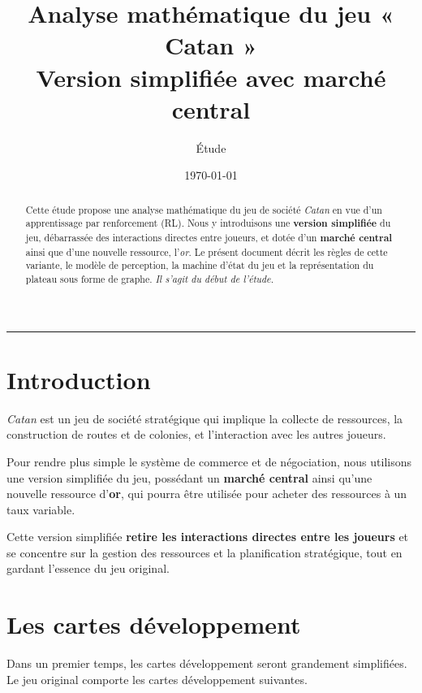 \documentclass[11pt,a4paper]{article}
\title{\vspace{-1.0cm}\textbf{Analyse mathématique du jeu « Catan »}\\[2pt]
       \large Version simplifiée avec marché central}
\author{Étude}
\date{\today}
\begin{document}
\maketitle

\begin{abstract}
\noindent
Cette étude propose une analyse mathématique du jeu de société \emph{Catan} en vue
d'un apprentissage par renforcement (RL). Nous y introduisons une \textbf{version
simplifiée} du jeu, débarrassée des interactions directes entre joueurs, et dotée
d'un \textbf{marché central} ainsi que d'une nouvelle ressource, l'\emph{or}. Le
présent document décrit les règles de cette variante, le modèle de perception, la
machine d'état du jeu et la représentation du plateau sous forme de graphe.
\emph{Il s'agit du début de l'étude.}
\end{abstract}

\tableofcontents
\vspace{0.5cm}
\hrule
\vspace{0.5cm}

\section{Introduction}

\emph{Catan} est un jeu de société stratégique qui implique la collecte de
ressources, la construction de routes et de colonies, et l'interaction avec les
autres joueurs.

Pour rendre plus simple le système de commerce et de négociation, nous utilisons une
version simplifiée du jeu, possédant un \textbf{marché central} ainsi qu'une nouvelle
ressource d'\textbf{or}, qui pourra être utilisée pour acheter des ressources à un
taux variable.

Cette version simplifiée \textbf{retire les interactions directes entre les joueurs}
et se concentre sur la gestion des ressources et la planification stratégique, tout
en gardant l'essence du jeu original.

\section{Les cartes développement}

Dans un premier temps, les cartes développement seront grandement simplifiées. Le jeu
original comporte les cartes développement suivantes.
\end{document}
